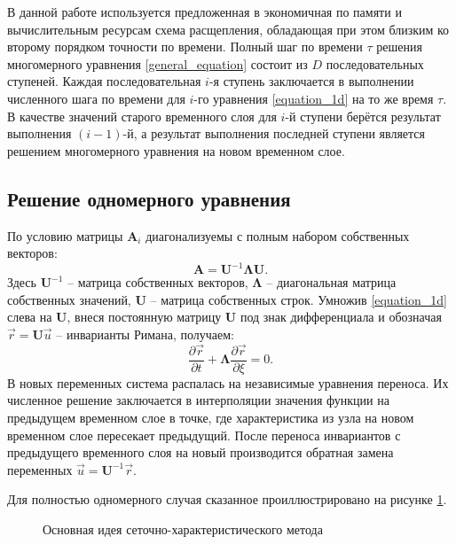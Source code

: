 В данной работе используется предложенная в \cite{chelnokov}
экономичная по памяти и вычислительным ресурсам схема расщепления, 
обладающая при этом близким ко второму порядком точности по времени.
Полный шаг по времени $\tau$ решения многомерного уравнения \eqref{general_equation} 
состоит из $D$ последовательных ступеней. 
Каждая последовательная $i$-я ступень заключается в выполнении численного шага по времени
для $i$-го уравнения \eqref{equation_1d} на то же время $\tau$. 
В качестве значений старого временного слоя для $i$-й ступени 
берётся результат выполнения $(i-1)$-й, 
а результат выполнения последней ступени является решением 
многомерного уравнения на новом временном слое. 


\subsection{Решение одномерного уравнения}
По условию матрицы $\mathbf{A}_i$ диагонализуемы с полным набором собственных векторов:
\begin{equation}
	\label{diagonal_view}
	\mathbf{A} = \mathbf{U}^{-1}\mathbf{\Lambda}\mathbf{U}.
\end{equation}
Здесь $\mathbf{U}^{-1}$ -- матрица собственных векторов, 
$\mathbf{\Lambda}$ -- диагональная матрица собственных значений,
$\mathbf{U}$ -- матрица собственных строк.
Умножив \eqref{equation_1d} слева на $\mathbf{U}$, 
внеся постоянную матрицу $\mathbf{U}$ под знак дифференциала
и обозначая $\vec{r} = \mathbf{U}\vec{u}$ -- инварианты Римана, получаем:
\begin{equation}
	\label{in_riemann_invariants}
	\frac{\partial\vec{r}}{\partial{t}}+\mathbf{\Lambda}\frac{\partial\vec{r}}{\partial{\xi}} = 0.
\end{equation}
В новых переменных система распалась на независимые уравнения переноса.
Их численное решение заключается в интерполяции значения функции
на предыдущем временном слое в точке, где характеристика из узла 
на новом временном слое пересекает предыдущий. 
После переноса инвариантов с предыдущего временного слоя на новый
производится обратная замена переменных $\vec{u} = \mathbf{U}^{-1}\vec{r}$.

Для полностью одномерного случая 
сказанное проиллюстрировано на рисунке \ref{pic:gcm-idea}.
\begin{figure}[H]
	\caption{Основная идея сеточно-характеристического метода}
	\label{pic:gcm-idea}
\end{figure}

